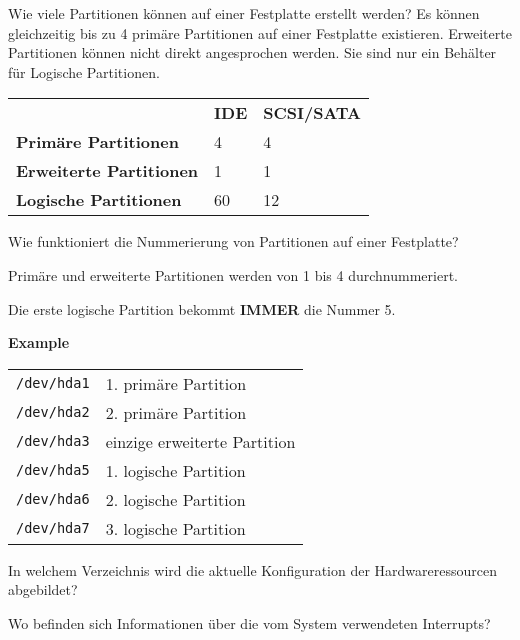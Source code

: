 \begin{flashcard}[Information]{Wie viele Partitionen können auf einer Festplatte erstellt werden?}
	Es können gleichzeitig bis zu 4 primäre Partitionen auf einer Festplatte existieren. Erweiterte Partitionen können nicht direkt angesprochen werden. Sie sind nur ein Behälter für Logische Partitionen.
	\begin{tabular}{lll}
		& \textbf{IDE} & \textbf{SCSI/SATA}\\
		\textbf{Primäre Partitionen}	& 4 	& 4 \\
		\textbf{Erweiterte Partitionen} & 1		& 1 \\
		\textbf{Logische Partitionen} & 60 & 12\\
	\end{tabular}
\end{flashcard}

\begin{flashcard}[Information]{Wie funktioniert die Nummerierung von Partitionen auf einer Festplatte?}
	
	\begin{description}
	\item Primäre und erweiterte Partitionen werden von 1 bis 4 durchnummeriert. 
	\item Die erste logische Partition bekommt \textbf{IMMER} die Nummer 5.
	\end{description}

	
	\textbf{Example}
	
	\begin{tabular}{ll}
		\texttt{/dev/hda1} & 1. primäre Partition\\
		\texttt{/dev/hda2} & 2. primäre Partition\\
		\texttt{/dev/hda3} & einzige erweiterte Partition\\
		\texttt{/dev/hda5} & 1. logische Partition\\
		\texttt{/dev/hda6} & 2. logische Partition\\
		\texttt{/dev/hda7} & 3. logische Partition\\
	\end{tabular}
\end{flashcard}

\begin{flashcard}[Folder]{In welchem Verzeichnis wird die aktuelle Konfiguration der Hardwareressourcen abgebildet?}
\end{flashcard}

\begin{flashcard}[Folder]{Wo befinden sich Informationen über die vom System verwendeten Interrupts?}
\end{flashcard}


